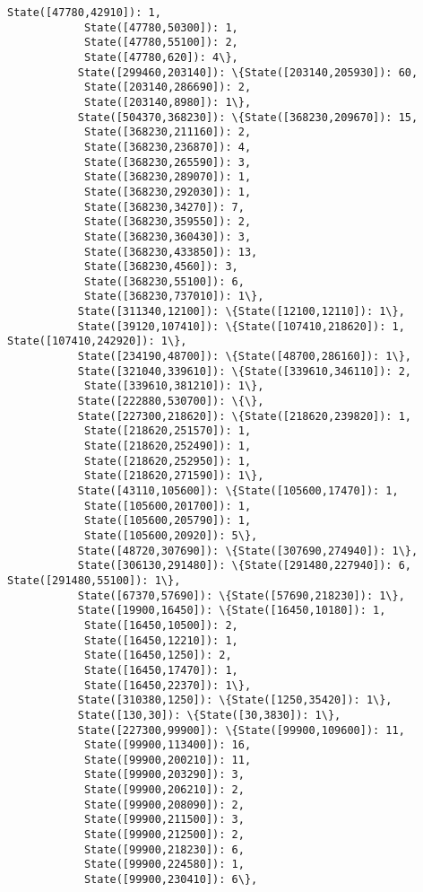 \documentclass[11pt]{article}
\begin{document}
\begin{Verbatim}[commandchars=\\\{\}]
            State([47780,42910]): 1,
            State([47780,50300]): 1,
            State([47780,55100]): 2,
            State([47780,620]): 4\},
           State([299460,203140]): \{State([203140,205930]): 60,
            State([203140,286690]): 2,
            State([203140,8980]): 1\},
           State([504370,368230]): \{State([368230,209670]): 15,
            State([368230,211160]): 2,
            State([368230,236870]): 4,
            State([368230,265590]): 3,
            State([368230,289070]): 1,
            State([368230,292030]): 1,
            State([368230,34270]): 7,
            State([368230,359550]): 2,
            State([368230,360430]): 3,
            State([368230,433850]): 13,
            State([368230,4560]): 3,
            State([368230,55100]): 6,
            State([368230,737010]): 1\},
           State([311340,12100]): \{State([12100,12110]): 1\},
           State([39120,107410]): \{State([107410,218620]): 1, State([107410,242920]): 1\},
           State([234190,48700]): \{State([48700,286160]): 1\},
           State([321040,339610]): \{State([339610,346110]): 2,
            State([339610,381210]): 1\},
           State([222880,530700]): \{\},
           State([227300,218620]): \{State([218620,239820]): 1,
            State([218620,251570]): 1,
            State([218620,252490]): 1,
            State([218620,252950]): 1,
            State([218620,271590]): 1\},
           State([43110,105600]): \{State([105600,17470]): 1,
            State([105600,201700]): 1,
            State([105600,205790]): 1,
            State([105600,20920]): 5\},
           State([48720,307690]): \{State([307690,274940]): 1\},
           State([306130,291480]): \{State([291480,227940]): 6, State([291480,55100]): 1\},
           State([67370,57690]): \{State([57690,218230]): 1\},
           State([19900,16450]): \{State([16450,10180]): 1,
            State([16450,10500]): 2,
            State([16450,12210]): 1,
            State([16450,1250]): 2,
            State([16450,17470]): 1,
            State([16450,22370]): 1\},
           State([310380,1250]): \{State([1250,35420]): 1\},
           State([130,30]): \{State([30,3830]): 1\},
           State([227300,99900]): \{State([99900,109600]): 11,
            State([99900,113400]): 16,
            State([99900,200210]): 11,
            State([99900,203290]): 3,
            State([99900,206210]): 2,
            State([99900,208090]): 2,
            State([99900,211500]): 3,
            State([99900,212500]): 2,
            State([99900,218230]): 6,
            State([99900,224580]): 1,
            State([99900,230410]): 6\},

\end{Verbatim}
\end{document}
